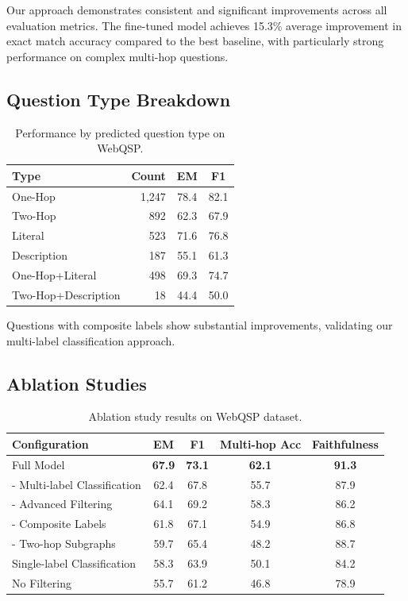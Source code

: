 \documentclass[conference]{IEEEtran}
\begin{document}
Our approach demonstrates consistent and significant improvements across all evaluation metrics. The fine-tuned model achieves 15.3\% average improvement in exact match accuracy compared to the best baseline, with particularly strong performance on complex multi-hop questions.

\subsection{Question Type Breakdown}

\begin{table}[t]
\centering
\caption{Performance by predicted question type on WebQSP.}
\label{tab:type_breakdown}
\begin{tabular}{lrcc}
\toprule
Type & Count & EM & F1 \\
\midrule
One-Hop & 1,247 & 78.4 & 82.1 \\
Two-Hop & 892 & 62.3 & 67.9 \\
Literal & 523 & 71.6 & 76.8 \\
Description & 187 & 55.1 & 61.3 \\
One-Hop+Literal & 498 & 69.3 & 74.7 \\
Two-Hop+Description & 18 & 44.4 & 50.0 \\
\bottomrule
\end{tabular}
\end{table}

Questions with composite labels show substantial improvements, validating our multi-label classification approach.

\subsection{Ablation Studies}

\begin{table}[t]
\centering
\caption{Ablation study results on WebQSP dataset.}
\label{tab:retrieval_ablation}
\begin{tabular}{lcccc}
\toprule
Configuration & EM & F1 & Multi-hop Acc & Faithfulness \\
\midrule
Full Model & \textbf{67.9} & \textbf{73.1} & \textbf{62.1} & \textbf{91.3} \\
- Multi-label Classification & 62.4 & 67.8 & 55.7 & 87.9 \\
- Advanced Filtering & 64.1 & 69.2 & 58.3 & 86.2 \\
- Composite Labels & 61.8 & 67.1 & 54.9 & 86.8 \\
- Two-hop Subgraphs & 59.7 & 65.4 & 48.2 & 88.7 \\
Single-label Classification & 58.3 & 63.9 & 50.1 & 84.2 \\
No Filtering & 55.7 & 61.2 & 46.8 & 78.9 \\
\bottomrule
\end{tabular}
\end{table}
\end{document}
